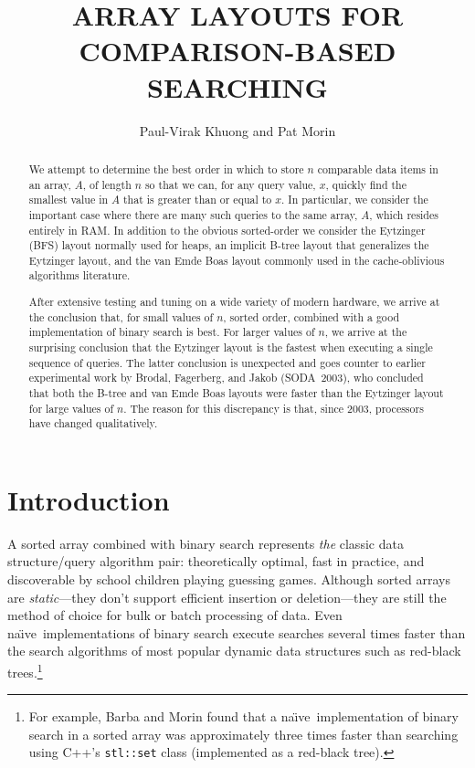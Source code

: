 \documentclass{patmorin}
\title{\MakeUppercase{Array Layouts for Comparison-Based Searching}}
\author{Paul-Virak Khuong and Pat Morin}
\newcommand{\naive}{na\"{\i}ve}
\begin{document}
\begin{titlepage}
\maketitle


\begin{abstract}
  We attempt to determine the best order in which to store $n$ comparable
  data items in an array, $A$, of length $n$ so that we can, for any query
  value, $x$, quickly find the smallest value in $A$ that is greater
  than or equal to $x$. In particular, we consider the important case
  where there are many such queries to the same array, $A$, which resides
  entirely in RAM.  In addition to the obvious sorted-order we consider
  the Eytzinger (BFS) layout normally used for heaps, an implicit B-tree
  layout that generalizes the Eytzinger layout, and the van Emde Boas
  layout commonly used in the cache-oblivious algorithms literature.

  After extensive testing and tuning on a wide variety of modern hardware,
  we arrive at the conclusion that, for small values of $n$, sorted
  order, combined with a good implementation of binary search is best.
  For larger values of $n$, we arrive at the surprising conclusion that
  the Eytzinger layout is the fastest when executing a single sequence
  of queries.  The latter conclusion is unexpected and goes counter to
  earlier experimental work by Brodal, Fagerberg, and Jakob (SODA~2003),
  who concluded that both the B-tree and van Emde Boas layouts were faster
  than the Eytzinger layout for large values of $n$.  The reason for this
  discrepancy is that, since 2003, processors have changed qualitatively.
\end{abstract}

\end{titlepage}

\tableofcontents
\newpage

\section{Introduction}

A sorted array combined with binary search represents \emph{the} classic
data structure/query algorithm pair: theoretically optimal, fast in
practice, and discoverable by school children playing guessing games.
Although sorted arrays are \emph{static}---they don't support efficient
insertion or deletion---they are still the method of choice for bulk or
batch processing of data. Even \naive\ implementations of binary search
execute searches several times faster than the search algorithms of most
popular dynamic data structures such as red-black trees.\footnote{For
example, Barba and Morin \cite{barba.morin:top-down} found that a \naive\
implementation of binary search in a sorted array was approximately
three times faster than searching using C++'s \texttt{stl::set} class
(implemented as a red-black tree).}
\end{document}
